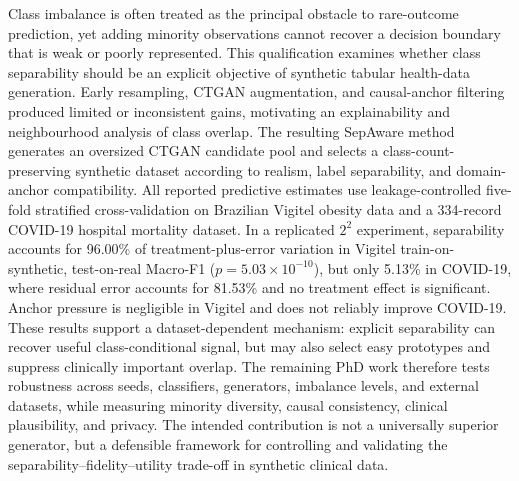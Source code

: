 Class imbalance is often treated as the principal obstacle to rare-outcome prediction, yet adding minority observations cannot recover a decision boundary that is weak or poorly represented. This qualification examines whether class separability should be an explicit objective of synthetic tabular health-data generation. Early resampling, CTGAN augmentation, and causal-anchor filtering produced limited or inconsistent gains, motivating an explainability and neighbourhood analysis of class overlap. The resulting SepAware method generates an oversized CTGAN candidate pool and selects a class-count-preserving synthetic dataset according to realism, label separability, and domain-anchor compatibility. All reported predictive estimates use leakage-controlled five-fold stratified cross-validation on Brazilian Vigitel obesity data and a 334-record COVID-19 hospital mortality dataset. In a replicated $2^2$ experiment, separability accounts for 96.00\% of treatment-plus-error variation in Vigitel train-on-synthetic, test-on-real Macro-F1 ($p=5.03\times10^{-10}$), but only 5.13\% in COVID-19, where residual error accounts for 81.53\% and no treatment effect is significant. Anchor pressure is negligible in Vigitel and does not reliably improve COVID-19. These results support a dataset-dependent mechanism: explicit separability can recover useful class-conditional signal, but may also select easy prototypes and suppress clinically important overlap. The remaining PhD work therefore tests robustness across seeds, classifiers, generators, imbalance levels, and external datasets, while measuring minority diversity, causal consistency, clinical plausibility, and privacy. The intended contribution is not a universally superior generator, but a defensible framework for controlling and validating the separability--fidelity--utility trade-off in synthetic clinical data.
